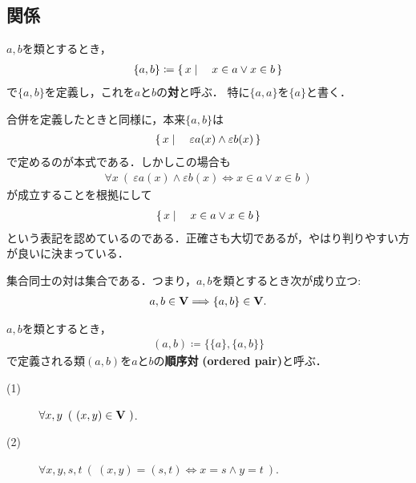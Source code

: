 \subsection{関係}
	\begin{screen}
		\begin{dfn}[対]
			$a,b$を類とするとき，
			\begin{align}
				\{a,b\} \coloneqq \left\{\, x \mid \quad x \in a \vee x \in b\, \right\}
			\end{align}
			で$\{a,b\}$を定義し，これを$a$と$b$の{\bf 対}と呼ぶ．
			特に$\{a,a\}$を$\{a\}$と書く．
		\end{dfn}
	\end{screen}
	
	合併を定義したときと同様に，本来$\{a,b\}$は
	\begin{align}
		\left\{\, x \mid \quad \varepsilon a(x) \wedge \varepsilon b(x)\, \right\}
	\end{align}
	で定めるのが本式である．しかしこの場合も
	\begin{align}
		\forall x\ (\ \varepsilon a(x) \wedge \varepsilon b(x)
		\Longleftrightarrow x \in a \vee x \in b\ )
	\end{align}
	が成立することを根拠にして
	\begin{align}
		\left\{\, x \mid \quad x \in a \vee x \in b\, \right\}
	\end{align}
	という表記を認めているのである．正確さも大切であるが，やはり判りやすい方が良いに決まっている．
	
	\begin{screen}
		\begin{axm}[対の公理]
			集合同士の対は集合である．つまり，$a,b$を類とするとき次が成り立つ:
			\begin{align}
				a,b \in \mathbf{V} \Longrightarrow \{a,b\} \in \mathbf{V}.
			\end{align}
		\end{axm}
	\end{screen}
	
	\begin{screen}
		\begin{dfn}[順序対]
			$a,b$を類とするとき，
			\begin{align}
				(a,b) \coloneqq \{\{a\},\{a,b\}\}
			\end{align}
			で定義される類$(a,b)$を$a$と$b$の{\bf 順序対}\index{じゅんじょつい@順序対}
			{\bf (ordered pair)}と呼ぶ．
		\end{dfn}
	\end{screen}
	
	\begin{screen}
		\begin{thm}[順序対は集合]\mbox{}
			\begin{description}
				\item[(1)] $\forall x,y\ \left(\ (x,y) \in \Univ\ \right)$.
				\item[(2)] $\forall x,y,s,t\ 
					\left(\ (x,y)=(s,t) \Longleftrightarrow x=s \wedge y=t\ \right)$.
			\end{description}
		\end{thm}
	\end{screen}
	
